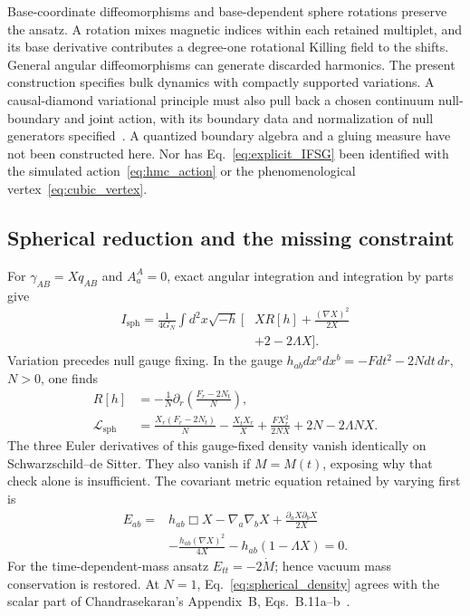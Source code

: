 Base-coordinate diffeomorphisms and base-dependent sphere rotations preserve the ansatz. A rotation mixes magnetic indices within each retained multiplet, and its base derivative contributes a degree-one rotational Killing field to the shifts. General angular diffeomorphisms can generate discarded harmonics. The present construction specifies bulk dynamics with compactly supported variations. A causal-diamond variational principle must also pull back a chosen continuum null-boundary and joint action, with its boundary data and normalization of null generators specified~\cite{LehnerEtAl2016}. A quantized boundary algebra and a gluing measure have not been constructed here. Nor has Eq.~\eqref{eq:explicit_IFSG} been identified with the simulated action~\eqref{eq:hmc_action} or the phenomenological vertex~\eqref{eq:cubic_vertex}.




\subsection{Spherical reduction and the missing constraint}

For $\gamma_{AB}=Xq_{AB}$ and $A_a^A=0$, exact angular integration and integration by parts give
\begin{align}\label{eq:spherical_repair}
I_{\mathrm{sph}}=\frac1{4G_N}\int d^2x\sqrt{-h}\,
\Big[&XR[h]+\frac{(\nabla X)^2}{2X}\nonumber\\
&+2-2\Lambda X\Big].
\end{align}
Variation precedes null gauge fixing. In the gauge $h_{ab}dx^a dx^b=-Fdt^2-2Ndt\,dr$, $N>0$, one finds
\begin{align}
R[h]&=-\frac1N\partial_r\!\left(\frac{F_r-2N_t}{N}\right),\nonumber\\
\mathcal L_{\mathrm{sph}}&=\frac{X_r(F_r-2N_t)}N-\frac{X_tX_r}X
+\frac{FX_r^2}{2NX}+2N-2\Lambda NX.\label{eq:spherical_density}
\end{align}
The three Euler derivatives of this gauge-fixed density vanish identically on Schwarzschild--de Sitter. They also vanish if $M=M(t)$, exposing why that check alone is insufficient. The covariant metric equation retained by varying first is
\begin{align}
E_{ab}={}&h_{ab}\Box X-\nabla_a\nabla_bX
+\frac{\partial_aX\partial_bX}{2X}\nonumber\\
&-\frac{h_{ab}(\nabla X)^2}{4X}-h_{ab}(1-\Lambda X)=0.
\end{align}
For the time-dependent-mass ansatz $E_{tt}=-2\dot M$; hence vacuum mass conservation is restored. At $N=1$, Eq.~\eqref{eq:spherical_density} agrees with the scalar part of Chandrasekaran's Appendix~B, Eqs.~B.11a--b~\cite{Chandrasekaran2026}.

